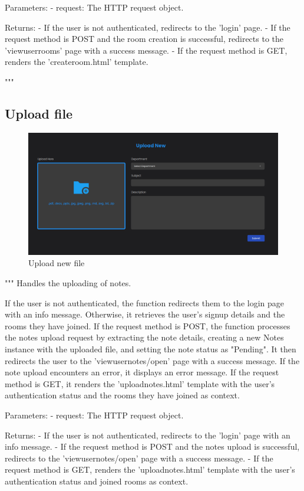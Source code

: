 \documentclass[paper=a4wide, fontsize=12pt]{scrartcl}	 %
\begin{document}
Parameters:
- request: The HTTP request object.

Returns:
- If the user is not authenticated, redirects to the 'login' page.
- If the request method is POST and the room creation is successful, redirects to the 'viewuserrooms' page with a success message.
- If the request method is GET, renders the 'createroom.html' template.

"""

\subsection{Upload file}
    \begin{figure}[H]
        \centering
        \includegraphics[scale=0.3]{demo/upload.png}
        \caption{Upload new file}
    \end{figure}

    """
    Handles the uploading of notes.

    If the user is not authenticated, the function redirects them to the login page with an info message.
    Otherwise, it retrieves the user's signup details and the rooms they have joined.
    If the request method is POST, the function processes the notes upload request by extracting the note details,
    creating a new Notes instance with the uploaded file, and setting the note status as "Pending".
    It then redirects the user to the 'viewusernotes/open' page with a success message.
    If the note upload encounters an error, it displays an error message.
    If the request method is GET, it renders the 'uploadnotes.html' template with the user's authentication status and
    the rooms they have joined as context.

    Parameters:
    - request: The HTTP request object.

    Returns:
    - If the user is not authenticated, redirects to the 'login' page with an info message.
    - If the request method is POST and the notes upload is successful, redirects to the 'viewusernotes/open' page with a success message.
    - If the request method is GET, renders the 'uploadnotes.html' template with the user's authentication status and joined rooms as context.
\end{document}
